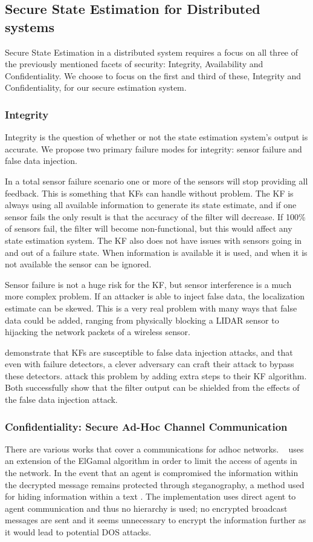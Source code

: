 \documentclass[conference]{IEEEtran}
\begin{document}
\subsection{Secure State Estimation for Distributed systems}
Secure State Estimation in a distributed system requires a focus on all three of the previously mentioned facets of security: Integrity, Availability and Confidentiality. We choose to focus on the first and third of these, Integrity and Confidentiality, for our secure estimation system.

\subsubsection{Integrity}
Integrity is the question of whether or not the state estimation system's output is accurate. We propose two primary failure modes for integrity: sensor failure and false data injection.

In a total sensor failure scenario one or more of the sensors will stop providing all feedback. This is something that KFs can handle without problem. The KF is always using all available information to generate its state estimate, and if one sensor fails the only result is that the accuracy of the filter will decrease. If 100\% of sensors fail, the filter will become non-functional, but this would affect any state estimation system. The KF also does not have issues with sensors going in and out of a failure state. When information is available it is used, and when it is not available the sensor can be ignored.

Sensor failure is not a huge risk for the KF, but  sensor interference is a much more complex problem. If an attacker is able to inject false data, the localization estimate can be skewed. This is a very real problem with many ways that false data could be added, ranging from physically blocking a LIDAR sensor to hijacking the network packets of a wireless sensor.

\textcite{Mo2010, Yang2013} demonstrate that KFs are susceptible to false data injection attacks, and that even with failure detectors, a clever adversary can craft their attack to bypass these detectors. \textcite{Bezzo_2014, Mo2014} attack this problem by adding extra steps to their KF algorithm. Both successfully show that the filter output can be shielded from the effects of the false data injection attack.

\subsubsection{Confidentiality: Secure Ad-Hoc Channel Communication}
There are various works that cover a communications for adhoc networks. ~\textcite{vegh2014securing} uses an extension of the ElGamal algorithm in order to limit the access of agents in the network. In the event that an agent is compromised the information within the decrypted message remains protected through steganography, a method used for hiding information within a text \cite{adi2009mechatronic}. The implementation uses direct agent to agent communication and thus no hierarchy is used; no encrypted broadcast messages are sent and it seems unnecessary to encrypt the information further as it would lead to potential DOS attacks.
\end{document}

